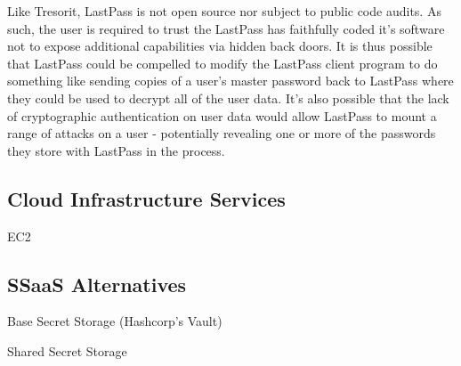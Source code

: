 Like Tresorit, LastPass is not open source nor subject to public code
audits. As such, the user is required to trust the LastPass has
faithfully coded it's software not to expose additional capabilities
via hidden back doors. It is thus possible that LastPass could be
compelled to modify the LastPass client program to do something like
sending copies of a user's master password back to LastPass where they
could be used to decrypt all of the user data. It's also possible that
the lack of cryptographic authentication on user data would allow
LastPass to mount a range of attacks on a user - potentially revealing
one or more of the passwords they store with LastPass in the process.

\subsection{Cloud Infrastructure Services}

EC2

\subsection{SSaaS Alternatives}

Base Secret Storage (Hashcorp's Vault)

Shared Secret Storage

